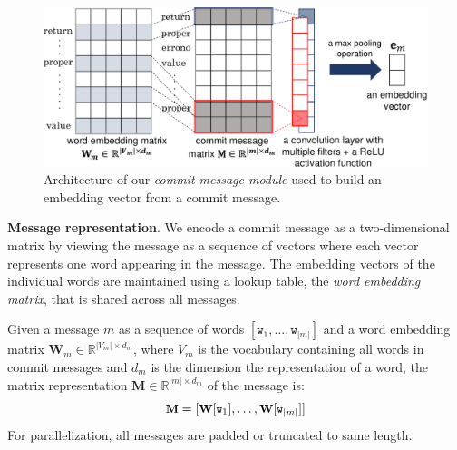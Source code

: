 \begin{figure}
\center
\includegraphics[scale=0.36]{figures/msg_model_ver2.pdf}
\caption{Architecture of our \textit{commit message module} used to build an embedding vector from a commit message.}
\label{fig:msg_model}
\vspace{-0.4cm}
\end{figure}


\textbf{Message representation}. We encode a commit message as a
two-dimensional matrix by viewing the message as a sequence of vectors
where each vector represents one word appearing in the
message. The embedding vectors of the individual words are maintained using a
lookup table, the {\em word embedding matrix}, that is shared across all
messages.

Given a message $m$ as a sequence of words
$[\texttt{w}_1, \dots, \texttt{w}_{|m|}]$ and a word embedding matrix
$\textbf{W}_m \in \mathbb{R}^{|V_m|\times d_m}$, where $V_m$ is the vocabulary containing all words in commit messages and  $d_m$ is the
dimension the representation of a word, the matrix representation
$\textbf{M} \in \mathbb{R}^{|m| \times d_m}$ of the message is:
\begin{equation} \footnotesize
\textbf{M} =
[\textbf{W}[\texttt{w}_1], \dots, \textbf{W}[\texttt{w}_{|m|}]]
\end{equation}
For parallelization, all messages are padded or truncated to same length.

